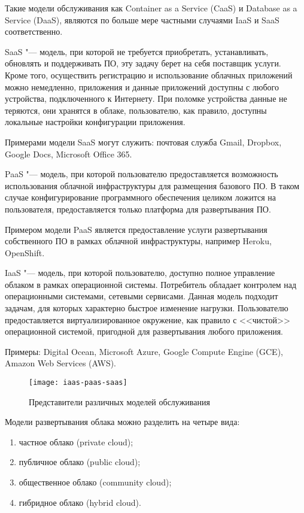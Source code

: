 Такие модели обслуживания как Container as a Service (CaaS) и Database as a Service (DaaS), являются по больше мере частными случаями IaaS и SaaS соответственно.

SaaS "--- модель, при которой не требуется приобретать, устанавливать, обновлять и поддерживать ПО, эту задачу берет на себя поставщик услуги.
Кроме того, осуществить регистрацию и использование облачных приложений можно немедленно, приложения и данные приложений доступны с любого устройства, подключенного к Интернету.
При поломке устройства данные не теряются, они хранятся в облаке, пользователю, как правило, доступны локальные настройки конфигурации приложения.

Примерами модели SaaS могут служить: почтовая служба Gmail, Dropbox, Google Docs, Microsoft Office 365.

PaaS "--- модель, при которой пользователю предоставляется возможность использования облачной инфраструктуры для размещения базового ПО.
В таком случае конфигурирование программного обеспечения целиком ложится на пользователя, предоставляется только платформа для развертывания ПО.

\clearpage

Примером модели PaaS является предоставление услуги развертывания собственного ПО в рамках облачной инфраструктуры, например Heroku, OpenShift.

IaaS "--- модель, при которой пользователю, доступно полное управление облаком в рамках операционной системы.
Потребитель обладает контролем над операционными системами, сетевыми сервисами.
Данная модель подходит задачам, для которых характерно быстрое изменение нагрузки.
Пользователю предоставляется виртуализированное окружение, как правило с <<чистой>> операционной системой, пригодной для развертывания любого приложения.

Примеры: Digital Ocean, Microsoft Azure, Google Compute Engine (GCE), Amazon Web Services (AWS).

\begin{figure}[ht]
    \centering
	\texttt{[image: iaas-paas-saas]}
	\caption{Представители различных моделей обслуживания}\label{pic:iaas-paas-saas}
\end{figure}

Модели развертывания облака можно разделить на четыре вида:
\begin{enumerate}
    \item частное облако (private cloud);
    \item публичное облако (public cloud);
    \item общественное облако (community cloud);
    \item гибридное облако (hybrid cloud).
\end{enumerate}

